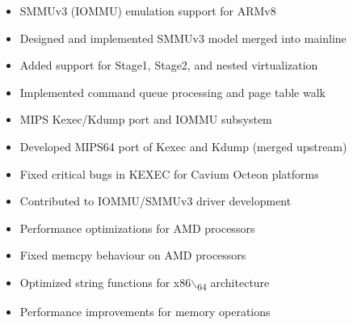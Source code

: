\documentclass[12pt,a4paper]{pawesome-cv}
\begin{document}
\begin{cventries}
\end{cventries}
\label{sec:orgdec99b9}

\begin{cventries}
\begin{opensourcecontent}
\begin{itemize}
\item SMMUv3 (IOMMU) emulation support for ARMv8
\item Designed and implemented SMMUv3 model merged into mainline
\item Added support for Stage1, Stage2, and nested virtualization
\item Implemented command queue processing and page table walk
\end{itemize}
\end{opensourcecontent}
\begin{opensourcecontent}
\begin{itemize}
\item MIPS Kexec/Kdump port and IOMMU subsystem
\item Developed MIPS64 port of Kexec and Kdump (merged upstream)
\item Fixed critical bugs in KEXEC for Cavium Octeon platforms
\item Contributed to IOMMU/SMMUv3 driver development
\end{itemize}
\end{opensourcecontent}
\begin{opensourcecontent}
\begin{itemize}
\item Performance optimizations for AMD processors
\item Fixed memcpy behaviour on AMD processors
\item Optimized string functions for x86$\backslash$\textsubscript{64} architecture
\item Performance improvements for memory operations
\end{itemize}
\end{opensourcecontent}

\end{cventries}
\end{document}

